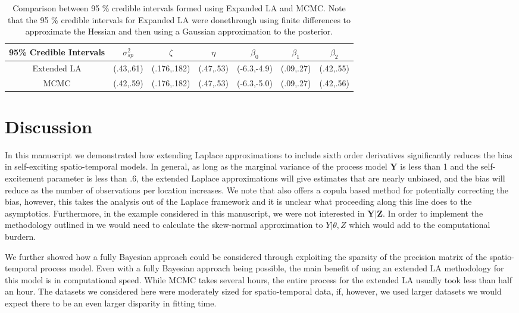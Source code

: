 \documentclass[11pt]{isuthesis}
\begin{document}
	\begin{table}[h]
		\begin{center}
			\begin{tabular}{ |c|c|c|c|c|c|c| } 
				\hline
				95\% Credible Intervals & $\sigma_{sp}^2$ & $\zeta$ & $\eta$ & $\beta_0$ & $\beta_1$ & $\beta_2$\\
				\hline 
				Extended LA & (.43,.61) & (.176,.182) &(.47,.53)& (-6.3,-4.9) & (.09,.27) & (.42,.55)\\
				MCMC & (.42,.59) & (.176,.182) & (.47,.53) & (-6.3,-5.0) & (.09,.27) & (.42,.56)\\
				\hline
			\end{tabular}
		\end{center}
		\caption{Comparison between 95 \% credible intervals formed using Expanded LA and MCMC.  Note that the 95 \% credible intervals for Expanded LA were donethrough using finite differences to approximate the Hessian and then using a Gaussian approximation to the posterior.}\label{Table:Results2}
	\end{table}
	
	\newpage
	\section{Discussion}
	In this manuscript we demonstrated how extending Laplace approximations to include sixth order derivatives significantly reduces the bias in self-exciting spatio-temporal models.  In general, as long as the marginal variance of the process model $\boldsymbol{Y}$ is less than 1 and the self-excitement parameter is less than .6, the extended Laplace approximations will give estimates that are nearly unbiased, and the bias will reduce as the number of observations per location increases.  We note that \cite{ferkingstad2015improving} also offers a copula based method for potentially correcting the bias, however, this takes the analysis out of the Laplace framework and it is unclear what proceeding along this line does to the asymptotics.  Furthermore, in the example considered in this manuscript, we were not interested in $\boldsymbol{Y}|\boldsymbol{Z}$.  In order to implement the methodology outlined in \cite{ferkingstad2015improving} we would need to calculate the skew-normal approximation to $Y|\theta,Z$ which would add to the computational burdern.
	
	We further showed how a fully Bayesian approach could be considered through exploiting the sparsity of the precision matrix of the spatio-temporal process model.  Even with a fully Bayesian approach being possible, the main benefit of using an extended LA methodology for this model is in computational speed.  While MCMC takes several hours, the entire process for the extended LA usually took less than half an hour.  The datasets we considered here were moderately sized for spatio-temporal data, if, however, we used larger datasets we would expect there to be an even larger disparity in fitting time.
	
\end{document}
